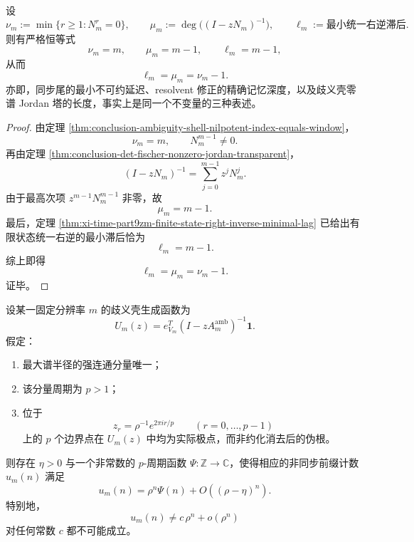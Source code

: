 \begin{corollary}\label{cor:conclusion-ambiguity-shell-nilpotent-memory-lag-locking}
设
\[
\nu_m:=\min\{r\ge 1:N_m^r=0\},
\qquad
\mu_m:=\deg\bigl((I-zN_m)^{-1}\bigr),
\qquad
\ell_m:=\text{最小统一右逆滞后}.
\]
则有严格恒等式
\[
\nu_m=m,
\qquad
\mu_m=m-1,
\qquad
\ell_m=m-1,
\]
从而
\[
\ell_m=\mu_m=\nu_m-1.
\]
亦即，同步尾的最小不可约延迟、resolvent 修正的精确记忆深度，以及歧义壳零谱 Jordan 塔的长度，事实上是同一个不变量的三种表述。
\end{corollary}
\begin{proof}
由定理 \ref{thm:conclusion-ambiguity-shell-nilpotent-index-equals-window}，
\[
\nu_m=m,
\qquad
N_m^{m-1}\neq 0.
\]
再由定理 \ref{thm:conclusion-det-fischer-nonzero-jordan-transparent}，
\[
(I-zN_m)^{-1}=\sum_{j=0}^{m-1}z^jN_m^j.
\]
由于最高次项 \(z^{m-1}N_m^{m-1}\) 非零，故
\[
\mu_m=m-1.
\]
最后，定理 \ref{thm:xi-time-part9zm-finite-state-right-inverse-minimal-lag} 已给出有限状态统一右逆的最小滞后恰为
\[
\ell_m=m-1.
\]
综上即得
\[
\ell_m=\mu_m=\nu_m-1.
\]
证毕。
\end{proof}

\begin{theorem}[歧义壳主极点的周期振幅障碍]\label{thm:conclusion-ambiguity-shell-periodic-amplitude-obstruction}
设某一固定分辨率 \(m\) 的歧义壳生成函数为
\[
U_m(z)=e_{V_m}^{T}(I-zA_m^{\mathrm{amb}})^{-1}\mathbf 1.
\]
假定：
\begin{enumerate}
\item 最大谱半径的强连通分量唯一；
\item 该分量周期为 \(p>1\)；
\item 位于
\[
z_r=\rho^{-1}e^{2\pi i r/p}
\qquad (r=0,\dots,p-1)
\]
上的 \(p\) 个边界点在 \(U_m(z)\) 中均为实际极点，而非约化消去后的伪根。
\end{enumerate}
则存在 \(\eta>0\) 与一个非常数的 \(p\)-周期函数 \(\Psi:\mathbb Z\to\mathbb C\)，使得相应的非同步前缀计数 \(u_m(n)\) 满足
\[
u_m(n)=\rho^n\Psi(n)+O((\rho-\eta)^n).
\]
特别地，
\[
u_m(n)\neq c\,\rho^n+o(\rho^n)
\]
对任何常数 \(c\) 都不可能成立。
\end{theorem}

